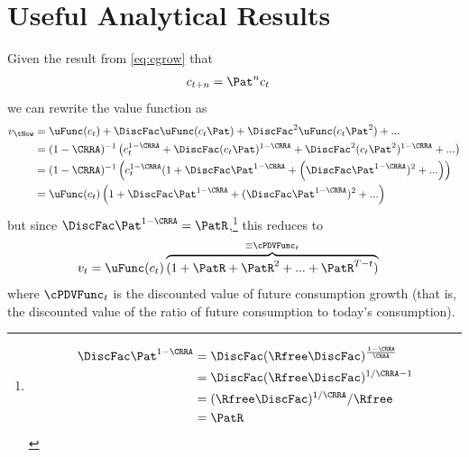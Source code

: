 \hypertarget{Useful-Analytical-Results}{}
\section{Useful Analytical Results}

Given the result from  \eqref{eq:cgrow} that
\begin{equation}\begin{gathered}\begin{aligned}
  c_{t+n} & =  \Pat^{n} c_{t} \notag
\end{aligned}\end{gathered}\end{equation}
we can rewrite the value function as
\begin{equation}\begin{gathered}\begin{aligned}
  v_{\tNow} & =  \uFunc(c_{t}) + \DiscFac \uFunc(c_{t}\Pat) + \DiscFac^{2} \uFunc(c_{t} \Pat^{2}) + ...
  \\ & =  (1-\CRRA)^{-1}\left(c_{t}^{1-\CRRA} + \DiscFac (c_{t}\Pat)^{1-\CRRA} + \DiscFac^{2} (c_{t} \Pat^{2})^{1-\CRRA} + ...\right)\notag
  \\ & =  (1-\CRRA)^{-1}\left(c_{t}^{1-\CRRA}(1+\DiscFac \Pat^{1-\CRRA} + \left(\DiscFac \Pat^{1-\CRRA})^{2} + ... \right) \right)\notag
\\ & =  \uFunc(c_{t})\left(1+\DiscFac \Pat^{1-\CRRA} + (\DiscFac \Pat^{1-\CRRA})^{2} + ... \right)\notag
\end{aligned}\end{gathered}\end{equation}
but since $\DiscFac \Pat^{1-\CRRA} = \PatR$,\footnote{
\begin{equation}\begin{gathered}\begin{aligned}
  \DiscFac \Pat^{1-\CRRA} & =  \DiscFac (\Rfree \DiscFac)^{\frac{1-\CRRA}{\CRRA}}
  \\ & =                               \DiscFac (\Rfree \DiscFac)^{1/\CRRA-1}
  \\ & =             (\Rfree \DiscFac)^{1/\CRRA} / \Rfree
           \\ & =  \PatR
\end{aligned}\end{gathered}\end{equation}}
this reduces to  \hypertarget{vFuncAnalytical}{}
\begin{equation}\begin{gathered}\begin{aligned}
  v_{t} &=  \uFunc(c_{t})\overbrace{(1+\PatR+\PatR^{2}+...+\PatR^{T-t})}^{\equiv \cPDVFunc_{t}} \label{eq:vFuncAnalytical}
\end{aligned}\end{gathered}\end{equation}
where $\cPDVFunc_{t}$ is the discounted value of future consumption growth (that is, the discounted value of the ratio of future consumption to today's consumption).

